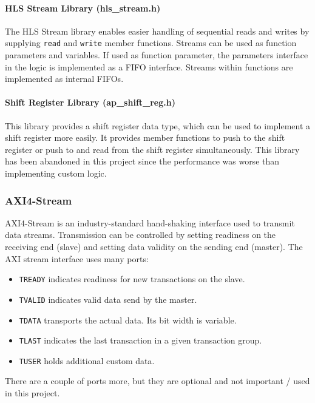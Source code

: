 \paragraph{HLS Stream Library (hls\_stream.h)}
The HLS Stream library enables easier handling of sequential reads and writes by supplying \texttt{read} and \texttt{write} member functions. Streams can be used as function parameters and variables. If used as function parameter, the parameters interface in the logic is implemented as a FIFO interface. Streams within functions are implemented as internal FIFOs.

\paragraph{Shift Register Library (ap\_shift\_reg.h)}
This library provides a shift register data type, which can be used to implement a shift register more easily. It provides member functions to push to the shift register or push to and read from the shift register simultaneously.
This library has been abandoned in this project since the performance was worse than implementing custom logic.

\subsubsection{AXI4-Stream}
AXI4-Stream is an industry-standard hand-shaking interface used to transmit data streams. Transmission can be controlled by setting readiness on the receiving end (slave) and setting data validity on the sending end (master). The AXI stream interface uses many ports:
\begin{itemize}
  \item \texttt{TREADY} indicates readiness for new transactions on the slave.
  \item \texttt{TVALID} indicates valid data send by the master.
  \item \texttt{TDATA} transports the actual data. Its bit width is variable.
  \item \texttt{TLAST} indicates the last transaction in a given transaction group.
  \item \texttt{TUSER} holds additional custom data.
\end{itemize}

There are a couple of ports more, but they are optional and not important / used in this project.